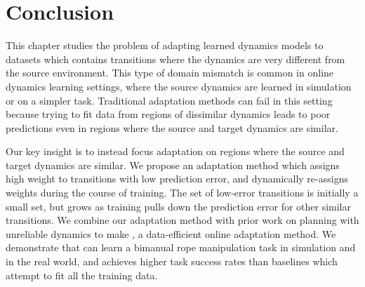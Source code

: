 \section{Conclusion} \label{ICRA:sec:conclusion}

This chapter studies the problem of adapting learned dynamics models to datasets which contains transitions where the dynamics are very different from the source environment. This type of domain mismatch is common in online dynamics learning settings, where the source dynamics are learned in simulation or on a simpler task. Traditional adaptation methods can fail in this setting because trying to fit data from regions of dissimilar dynamics leads to poor predictions even in regions where the source and target dynamics are similar.

Our key insight is to instead focus adaptation on regions where the source and target dynamics are similar. We propose an adaptation method which assigns high weight to transitions with low prediction error, and dynamically re-assigns weights during the course of training. The set of low-error transitions is initially a small set, but grows as training pulls down the prediction error for other similar transitions. We combine our adaptation method with prior work on planning with unreliable dynamics to make \FOCUS{}, a data-efficient online adaptation method. We demonstrate that \FOCUS{} can learn a bimanual rope manipulation task in simulation and in the real world, and achieves higher task success rates than baselines which attempt to fit all the training data.